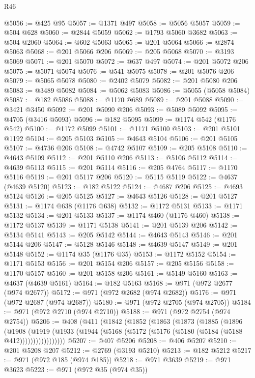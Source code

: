 \begin{lexlean}{R46}
\begin{coremodule}
@5056 := @425 @95
@5057 := @1371 @497
@5058 := @5056 @5057
@5059 := @504 @628
@5060 := @2844 @5059
@5062 := @1793 @5060 @3682
@5063 := @504 @2060
@5064 := @602 @5063
@5065 := @201 @5064
@5066 := @2874 @5063
@5068 := @201 @5066 @206
@5069 := @205 @5068
@5070 := @3193 @5069
@5071 := @201 @5070
@5072 := @637 @497
@5074 := @201 @5072 @206
@5075 := @5071 @5074
@5076 := @541 @5075
@5078 := @201 @5076 @206
@5079 := @5065 @5078
@5080 := @2402 @5079
@5082 := @201 @5080 @206
@5083 := @3489 @5082
@5084 := @5062 @5083
@5086 := @5055 (@5058 @5084)
@5087 := @182 @5086
@5088 := @1170 @689
@5089 := @201 @5088
@5090 := @3421 @3450
@5092 := @201 @5090 @206
@5093 := @5089 @5092
@5095 := @4705 (@3416 @5093)
@5096 := @182 @5095
@5099 := @1174 @542 (@1176 @542)
@5100 := @1172 @5099
@5101 := @1171 @5100
@5103 := @201 @5101 @1192
@5104 := @205 @5103
@5105 := @4643 @5104
@5106 := @201 @5105
@5107 := @4736 @206
@5108 := @4742 @5107
@5109 := @205 @5108
@5110 := @4643 @5109
@5112 := @201 @5110 @206
@5113 := @5106 @5112
@5114 := @4639 @5113
@5115 := @201 @5114
@5116 := @205 @4764
@5117 := @1170 @5116
@5119 := @201 @5117 @206
@5120 := @5115 @5119
@5122 := @4637 (@4639 @5120)
@5123 := @182 @5122
@5124 := @4687 @206
@5125 := @4693 @5124
@5126 := @205 @5125
@5127 := @4643 @5126
@5128 := @201 @5127
@5131 := @1174 @638 (@1176 @638)
@5132 := @1172 @5131
@5133 := @1171 @5132
@5134 := @201 @5133
@5137 := @1174 @460 (@1176 @460)
@5138 := @1172 @5137
@5139 := @1171 @5138
@5141 := @201 @5139 @206
@5142 := @5134 @5141
@5143 := @205 @5142
@5144 := @4643 @5143
@5146 := @201 @5144 @206
@5147 := @5128 @5146
@5148 := @4639 @5147
@5149 := @201 @5148
@5152 := @1174 @35 (@1176 @35)
@5153 := @1172 @5152
@5154 := @1171 @5153
@5156 := @201 @5154 @206
@5157 := @205 @5156
@5158 := @1170 @5157
@5160 := @201 @5158 @206
@5161 := @5149 @5160
@5163 := @4637 (@4639 @5161)
@5164 := @182 @5163
@5168 := @971 (@972 @2677 (@974 @2677))
@5172 := @971 (@972 @2682 (@974 @2682))
@5176 := @971 (@972 @2687 (@974 @2687))
@5180 := @971 (@972 @2705 (@974 @2705))
@5184 := @971 (@972 @2710 (@974 @2710))
@5188 := @971 (@972 @2754 (@974 @2754))
@5206 := @408
    (@411
      (@1842
        (@1852
          (@1863
            (@1873
              (@1885
                (@1896
                  (@1908
                    (@1919
                      (@1933 (@1944 (@5168 (@5172 (@5176 (@5180 (@5184 (@5188 @412)))))))))))))))))
@5207 := @407 @5206
@5208 := @406 @5207
@5210 := @201 @5208 @207
@5212 := @2769 (@3193 @5210)
@5213 := @182 @5212
@5217 := @971 (@972 @185 (@974 @185))
@5218 := @971 @3639
@5219 := @971 @3623
@5223 := @971 (@972 @35 (@974 @35))

\end{coremodule}
\end{lexlean}
